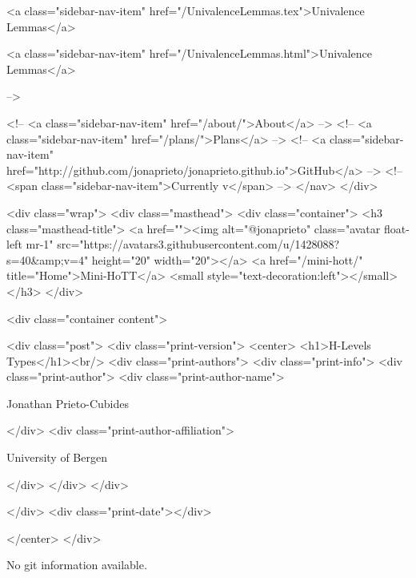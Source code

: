       
    
      
        
          <a class="sidebar-nav-item" href="/UnivalenceLemmas.tex">Univalence Lemmas</a>
        
      
    
      
        
          <a class="sidebar-nav-item" href="/UnivalenceLemmas.html">Univalence Lemmas</a>
        
      
     -->

    <!-- <a class="sidebar-nav-item" href="/about/">About</a> -->
    <!-- <a class="sidebar-nav-item" href="/plans/">Plans</a> -->
    <!-- <a class="sidebar-nav-item" href="http://github.com/jonaprieto/jonaprieto.github.io">GitHub</a> -->
    <!-- <span class="sidebar-nav-item">Currently v</span> -->
  </nav>
</div>

    <div class="wrap">
      <div class="masthead">
        <div class="container">
          <h3 class="masthead-title">
            <a href=""><img alt="@jonaprieto" class="avatar float-left mr-1" src="https://avatars3.githubusercontent.com/u/1428088?s=40&amp;v=4" height="20" width="20"></a>
            <a href="/mini-hott/" title="Home">Mini-HoTT</a>
            <small style="text-decoration:left"></small>
          </h3>
        </div>
      
      <div class="container content">
        







<div class="post">
  <div class="print-version">
    <center>
      <h1>H-Levels Types</h1><br/>
        <div class="print-authors">
          <div class="print-info">
            <div class="print-author">
              <div class="print-author-name">
                
                  Jonathan Prieto-Cubides
                
              </div>
              <div class="print-author-affiliation">
                
                  University of Bergen
                
                </div>
            </div>
          </div>
          
          
        </div>
        <div class="print-date"></div>
        
        
    </center>
  </div>

  
  No git information available.
  

